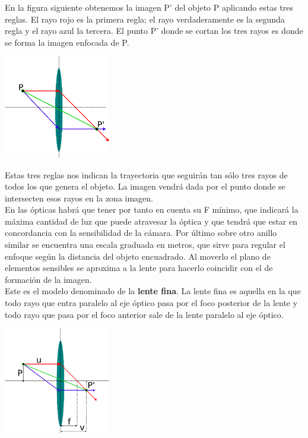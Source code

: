 En la figura siguiente obtenemos la imagen P' del objeto P aplicando estas tres reglas. El rayo rojo es la primera regla;
el rayo verdaderamente es la segunda regla y el rayo azul la tercera. El punto P' donde se cortan los tres rayos es donde se forma la
imagen enfocada de P.
\begin{center}
	\includegraphics[width=0.35\textwidth]{Contenido/Cuerpo/Capitulo2/Fig1_10.eps}
	\label{fig:MarcoTeorico:Fig10}
\end{center}
Estas tres reglas nos indican la trayectoria que seguirán tan sólo tres rayos de todos los que genera el objeto. La imagen vendrá
dada por el punto donde se intersecten esos rayos en la zona imagen.\\
En las ópticas habrá que tener por
tanto en cuenta su F mínimo, que indicará la máxima cantidad de luz que puede
atravesar la óptica y que tendrá que estar en concordancia con la sensibilidad de la
cámara. Por último sobre otro anillo similar se encuentra una escala graduada en metros,
que sirve para regular el enfoque según la distancia del objeto encuadrado. Al moverlo
el plano de elementos sensibles se aproxima a la lente para hacerlo coincidir con el de
formación de la imagen.\\
Este es el modelo denominado de la \textbf{lente fina}. La
lente fina es aquella en la que todo rayo que entra paralelo al eje óptico pasa por el foco
posterior de la lente y todo rayo que pasa por el foco anterior sale de la lente paralelo al
eje óptico.
\begin{center}
	\includegraphics[width=0.35\textwidth]{Contenido/Cuerpo/Capitulo2/Fig1_11.eps}
	\label{fig:MarcoTeorico:Fig11}
\end{center}

